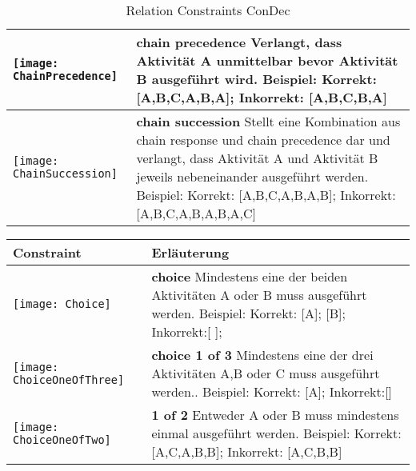 \begin {table}
\begin{tabular}{|p{}|p{}|}
\begin{center}
  \texttt{[image: ChainPrecedence]} %
    \end{center}&
\textbf{chain precedence} \newline
 Verlangt, dass Aktivität A unmittelbar bevor Aktivität B ausgeführt wird.\newline
 Beispiel: Korrekt: [A,B,C,A,B,A]; Inkorrekt: [A,B,C,B,A] \\
\hline
\begin{center}

  \texttt{[image: ChainSuccession]} %
    \end{center} &
\textbf{chain succession} \newline  Stellt eine Kombination aus chain response und chain precedence dar und verlangt, dass Aktivität A und Aktivität B jeweils nebeneinander ausgeführt werden. \newline
Beispiel: Korrekt: [A,B,C,A,B,A,B]; Inkorrekt: [A,B,C,A,B,A,B,A,C]\\
\hline
 \end{tabular}
 \caption{Relation Constraints ConDec}
\label{tab:relation}
 \end{table}

 

\begin{tabular}{|p{}|p{}|}
\hline
\textbf{Constraint} & \textbf{Erläuterung}\\
\hline

\begin{center}

  \texttt{[image: Choice]} %
    \end{center}&

\textbf{choice} \newline  Mindestens eine der beiden Aktivitäten A oder B muss ausgeführt werden.  \newline
Beispiel: Korrekt: [A]; [B]; Inkorrekt:[ ];
\\
\hline

\begin{center}
  \texttt{[image: ChoiceOneOfThree]} %
    \end{center} &
    \textbf{choice 1 of 3}\newline
Mindestens eine der drei Aktivitäten A,B oder C muss ausgeführt werden.. \newline
Beispiel: Korrekt: [A]; Inkorrekt:[]
\\
\hline
\begin{center}

  \texttt{[image: ChoiceOneOfTwo]} %
    \end{center}&
\textbf{1 of 2} \newline Entweder A oder B muss mindestens einmal ausgeführt werden.\newline
Beispiel: Korrekt: [A,C,A,B,B]; Inkorrekt: [A,C,B,B]\\
\hline

\end{tabular}

